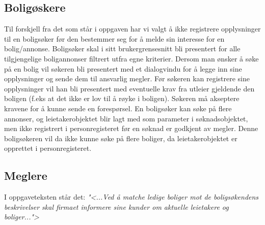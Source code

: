 \subsection{Boligøskere} \label{sec:sokere}
Til forskjell fra det som står i oppgaven har vi valgt å ikke registrere opplysninger til en boligsøker før den bestemmer seg for å melde sin interesse for en bolig/annonse. Boligsøker skal i sitt brukergrensesnitt bli presentert for alle tilgjengelige boligannonser filtrert utfra egne kriterier. Dersom man ønsker å søke på en bolig vil søkeren bli presentert med et dialogvindu for å legge inn sine opplysninger og sende dem til ansvarlig megler. Før søkeren kan registrere sine opplysninger vil han bli presentert med eventuelle krav fra utleier gjeldende den boligen (f.eks at det ikke er lov til å røyke i boligen). Søkeren må akseptere kravene for å kunne sende en forespørsel. En boligsøker kan søke på flere annonser, og leietakerobjektet blir lagt med som parameter i søknadsobjektet, men ikke registrert i personregisteret før en søknad er godkjent av megler. Denne boligsøkeren vil da ikke kunne søke på flere boliger, da leietakerobjektet er opprettet i personregisteret. 

\subsection{Meglere}
I oppgaveteksten står det:
\textit{"<...Ved å matche ledige boliger mot de boligsøkendens beskrivelser skal firmaet informere sine kunder om aktuelle leietakere og boliger...">}

